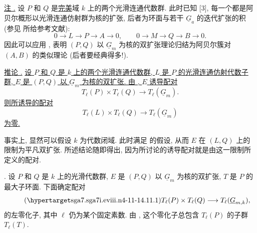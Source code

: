 \medskip
\noindent\underline{注 .} 设 $P$ 和 $Q$ 是\underline{完美}域 $k$ 上的两个光滑连通代数群. 此时已知 [3], 每一个都是阿贝尔概形以光滑连通仿射群为核的扩张, 后者为环面与若干 $\underline G_a$ 的迭代扩张的积 (参见  所给参考文献):
\[
 0\longrightarrow L\longrightarrow P\longrightarrow A
 \longrightarrow0,
 \qquad
 0\longrightarrow M\longrightarrow Q\longrightarrow B
 \longrightarrow0.
\]
因此可以应用 , 表明 $(P,Q)$ 以 $\underline G_m$ 为核的双扩张理论归结为阿贝尔簇对 $(A,B)$ 的类似理论 (后者要经典得多!).

\medskip
\noindent\underline{推论 .} \underline{设 $P$ 和 $Q$ 是 $k$ 上的两个光滑连通代数群, $L$ 是 $P$ 的光滑连通仿射代数子群, $E$ 是 $(P,Q)$ 以 $\underline G_m$ 为核的双扩张. 由 , $E$ 诱导配对}
\[
 T_\ell(P)\times T_\ell(Q)\longrightarrow T_\ell(\underline G_m).
\]
\underline{则所诱导的配对}
\[
 T_\ell(L)\times T_\ell(Q)\longrightarrow T_\ell(\underline G_m)
\]
\underline{为零.}

事实上, 显然可以假设 $k$ 为代数闭域. 此时满足  的假设, 从而 $E$ 在 $(L,Q)$ 上的限制为平凡双扩张. 所述结论随即得出, 因为所讨论的诱导配对就是由这一限制所定义的配对.



\medskip
\noindent {}. 设 $P$ 和 $Q$ 是 $k$ 上的光滑代数群, $E$ 是 $(P,Q)$ 以 $\underline G_m$ 为核的双扩张, $T$ 是 $P$ 的最大子环面. 下面确定配对
\begin{equation}\tag{\SGARefTarget{sga7.sga7i.eviii.n4-11-1}{4.11.1}}
 T_\ell(P)\times T_\ell(Q)
 \longrightarrow T_\ell(\underline G_{m,k}),
\end{equation}
的左零化子, 其中 $\ell$ 仍为某个固定素数. 由 , 这个零化子总包含 $T_\ell(P)$ 的子群 $T_\ell(T)$.

